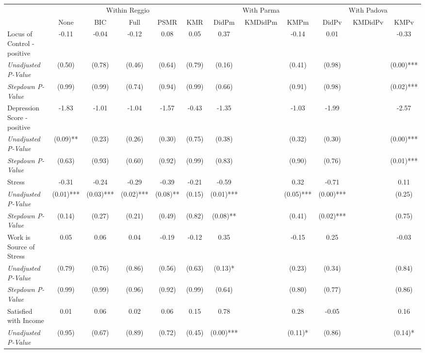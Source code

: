 \begin{tabular}{l c c c c c c c c c c c}
\toprule
& \multicolumn{5}{c}{Within Reggio} & \multicolumn{3}{c}{With Parma} & \multicolumn{3}{c}{With Padova} \\\cmidrule(lr){2-6} \cmidrule(lr){7-9} \cmidrule(lr){10-12}
 & None & BIC & Full & PSMR & KMR & DidPm & KMDidPm & KMPm & DidPv & KMDidPv & KMPv \\
\midrule
Locus of Control - positive & -0.11 & -0.04 & -0.12 & 0.08 & 0.05 & 0.37 & & -0.14 & 0.01 & & -0.33 \\
\quad \textit{Unadjusted P-Value} & (0.50) & (0.78) & (0.46) & (0.64) & (0.79) & (0.16) & & (0.41) & (0.98) & & (0.00)*** \\
\quad \textit{Stepdown P-Value} & (0.99) & (0.99) & (0.74) & (0.94) & (0.99) & (0.66) & & (0.91) & (0.98) & & (0.02)*** \\
Depression Score - positive & -1.83 & -1.01 & -1.04 & -1.57 & -0.43 & -1.35 & & -1.03 & -1.99 & & -2.57 \\
\quad \textit{Unadjusted P-Value} & (0.09)** & (0.23) & (0.26) & (0.30) & (0.75) & (0.38) & & (0.32) & (0.30) & & (0.00)*** \\
\quad \textit{Stepdown P-Value} & (0.63) & (0.93) & (0.60) & (0.92) & (0.99) & (0.83) & & (0.90) & (0.76) & & (0.01)*** \\
Stress & -0.31 & -0.24 & -0.29 & -0.39 & -0.21 & -0.59 & & 0.32 & -0.71 & & 0.11 \\
\quad \textit{Unadjusted P-Value} & (0.01)*** & (0.03)*** & (0.02)*** & (0.08)** & (0.15) & (0.01)*** & & (0.05)*** & (0.00)*** & & (0.25) \\
\quad \textit{Stepdown P-Value} & (0.14) & (0.27) & (0.21) & (0.49) & (0.82) & (0.08)** & & (0.41) & (0.02)*** & & (0.75) \\
Work is Source of Stress & 0.05 & 0.06 & 0.04 & -0.19 & -0.12 & 0.35 & & -0.15 & 0.25 & & -0.03 \\
\quad \textit{Unadjusted P-Value} & (0.79) & (0.76) & (0.86) & (0.56) & (0.63) & (0.13)* & & (0.23) & (0.34) & & (0.84) \\
\quad \textit{Stepdown P-Value} & (0.99) & (0.99) & (0.96) & (0.92) & (0.99) & (0.64) & & (0.80) & (0.77) & & (0.86) \\
Satisfied with Income & 0.01 & 0.06 & 0.02 & 0.06 & 0.15 & 0.78 & & 0.28 & -0.05 & & 0.16 \\
\quad \textit{Unadjusted P-Value} & (0.95) & (0.67) & (0.89) & (0.72) & (0.45) & (0.00)*** & & (0.11)* & (0.86) & & (0.14)* \\

\end{tabular}
